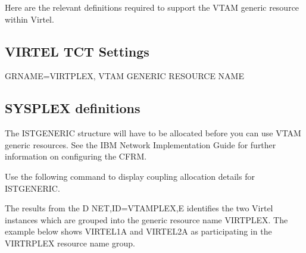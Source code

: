 \documentclass[letterpaper,10pt,english]{sphinxmanual}
\begin{document}
Here are the relevant definitions required to support the VTAM generic resource within Virtel.

\ignorespaces 

\subsection{VIRTEL TCT Settings}
\label{\detokenize{connectivity_guide:virtel-tct-settings}}\label{\detokenize{connectivity_guide:index-170}}
GRNAME=VIRTPLEX, VTAM GENERIC RESOURCE NAME

\ignorespaces 

\subsection{SYSPLEX definitions}
\label{\detokenize{connectivity_guide:sysplex-definitions}}\label{\detokenize{connectivity_guide:index-171}}
The ISTGENERIC structure will have to be allocated before you can use VTAM generic resources. See the IBM Network Implementation Guide for further information on configuring the CFRM.

Use the following command to display coupling allocation details for ISTGENERIC.

\begin{sphinxVerbatim}[commandchars=\\\{\}]
 
\end{sphinxVerbatim}


The results from the D NET,ID=VTAMPLEX,E identifies the two Virtel instances which are grouped into the generic resource name VIRTPLEX. The example below shows VIRTEL1A and VIRTEL2A as participating in the VIRTRPLEX resource name group.
\end{document}
